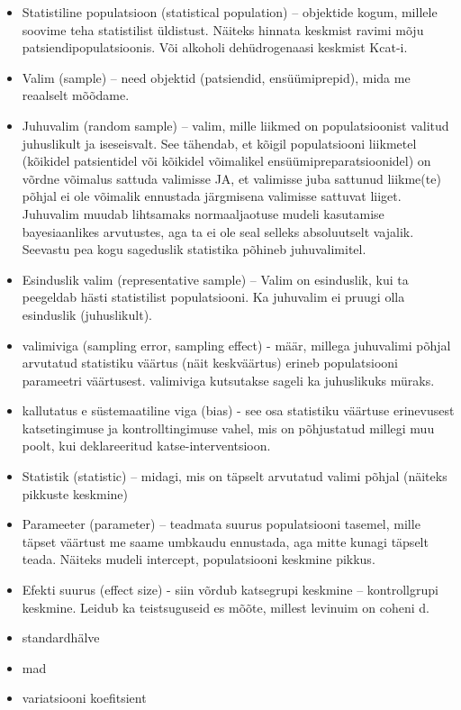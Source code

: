 \documentclass[]{book}
\begin{document}
\begin{itemize}
\item
  Statistiline populatsioon (statistical population) -- objektide kogum, millele soovime teha statistilist üldistust. Näiteks hinnata keskmist ravimi mõju patsiendipopulatsioonis. Või alkoholi dehüdrogenaasi keskmist Kcat-i.
\item
  Valim (sample) -- need objektid (patsiendid, ensüümiprepid), mida me reaalselt mõõdame.
\item
  Juhuvalim (random sample) -- valim, mille liikmed on populatsioonist valitud juhuslikult ja iseseisvalt. See tähendab, et kõigil populatsiooni liikmetel (kõikidel patsientidel või kõikidel võimalikel ensüümipreparatsioonidel) on võrdne võimalus sattuda valimisse JA, et valimisse juba sattunud liikme(te) põhjal ei ole võimalik ennustada järgmisena valimisse sattuvat liiget. Juhuvalim muudab lihtsamaks normaaljaotuse mudeli kasutamise bayesiaanlikes arvutustes, aga ta ei ole seal selleks absoluutselt vajalik. Seevastu pea kogu sageduslik statistika põhineb juhuvalimitel.
\item
  Esinduslik valim (representative sample) -- Valim on esinduslik, kui ta peegeldab hästi statistilist populatsiooni. Ka juhuvalim ei pruugi olla esinduslik (juhuslikult).
\item
  valimiviga (sampling error, sampling effect) - määr, millega juhuvalimi põhjal arvutatud statistiku väärtus (näit keskväärtus) erineb populatsiooni parameetri väärtusest. valimiviga kutsutakse sageli ka juhuslikuks müraks.
\item
  kallutatus e süstemaatiline viga (bias) - see osa statistiku väärtuse erinevusest katsetingimuse ja kontrolltingimuse vahel, mis on põhjustatud millegi muu poolt, kui deklareeritud katse-interventsioon.
\item
  Statistik (statistic) -- midagi, mis on täpselt arvutatud valimi põhjal (näiteks pikkuste keskmine)
\item
  Parameeter (parameter) -- teadmata suurus populatsiooni tasemel, mille täpset väärtust me saame umbkaudu ennustada, aga mitte kunagi täpselt teada. Näiteks mudeli intercept, populatsiooni keskmine pikkus.
\item
  Efekti suurus (effect size) - siin võrdub katsegrupi keskmine -- kontrollgrupi keskmine. Leidub ka teistsuguseid es mõõte, millest levinuim on coheni d.
\item
  standardhälve
\item
  mad
\item
  variatsiooni koefitsient

\end{itemize}
\end{document}
